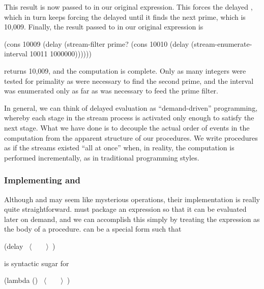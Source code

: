 \noindent
This result is now passed to  in our original expression.
This forces the delayed , which in turn keeps forcing the
delayed  until it finds the next prime, which
is 10,009.  Finally, the result passed to  in our original
expression is

\begin{codeBlock}
(cons 10009
      (delay (stream-filter
              prime?
              (cons 10010
                    (delay (stream-enumerate-interval
                            10011
                            1000000))))))
\end{codeBlock}

\noindent
{} returns 10,009, and the computation is complete.  Only as
many integers were tested for primality as were necessary to find the second
prime, and the interval was enumerated only as far as was necessary to feed the
prime filter.

In general, we can think of delayed evaluation as ``demand-driven''
programming, whereby each stage in the stream process is activated only enough
to satisfy the next stage.  What we have done is to decouple the actual order
of events in the computation from the apparent structure of our procedures.  We
write procedures as if the streams existed ``all at once'' when, in reality,
the computation is performed incrementally, as in traditional programming
styles.

\subsubsection*{Implementing  and }

Although  and  may seem like mysterious operations,
their implementation is really quite straightforward.   must
package an expression so that it can be evaluated later on demand, and we can
accomplish this simply by treating the expression as the body of a procedure.
 can be a special form such that

\begin{codeBlock}
(delay ~\(\langle \)~~~~\(\rangle \)~)
\end{codeBlock}

\noindent
is syntactic sugar for

\begin{codeBlock}
(lambda () ~\(\langle \)~~~~\(\rangle \)~)
\end{codeBlock}

